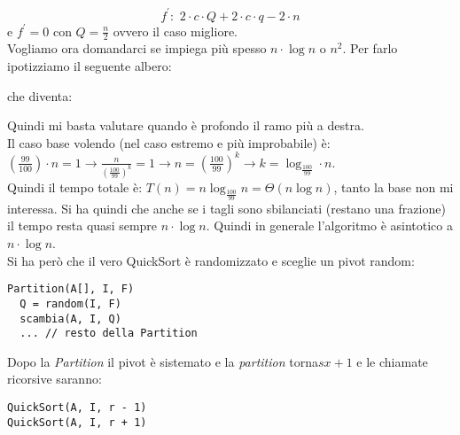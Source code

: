 \documentclass[a4paper,12pt,oneside,tikz]{book}
\begin{document}
$$f^{'}:\,\, 2\cdot c\cdot Q+2\cdot c\cdot q-2\cdot n$$
e $f^{'}=0$ con $Q=\frac{n}{2}$ ovvero il caso migliore.\\
Vogliamo ora domandarci se impiega più spesso $n\cdot\log n$ o $n^2$. Per farlo ipotizziamo il seguente albero:
\begin{center}
\end{center}
che diventa: 
\begin{center}
\end{center}
\newpage
Quindi mi basta valutare quando è profondo il ramo più a destra.\\
Il caso base volendo (nel caso estremo e più improbabile) è: $\left(\frac{99}{100}\right)\cdot n=1\rightarrow\frac{n}{\left(\frac{100}{99}\right)^k}=1\rightarrow n=\left(\frac{100}{99}\right)^k\rightarrow k=\log_{\frac{100}{99}}\cdot n$. \\Quindi il tempo totale è: $T(n)=n\log_{\frac{100}{99}}n=\Theta(n\log n)$, tanto la base non mi interessa.
Si ha quindi che anche se i tagli sono sbilanciati (restano una frazione) il tempo resta quasi sempre $n\cdot\log n$. Quindi in generale l'algoritmo è asintotico a $n\cdot\log n$. \\
Si ha però che il vero QuickSort è randomizzato e sceglie un pivot random:
\begin{verbatim}
Partition(A[], I, F)
  Q = random(I, F)
  scambia(A, I, Q)
  ... // resto della Partition
\end{verbatim}
Dopo la \textit{Partition} il pivot è sistemato e la \textit{partition} torna$sx+1$ e le chiamate ricorsive saranno:
\begin{verbatim}
QuickSort(A, I, r - 1)
QuickSort(A, I, r + 1)
\end{verbatim} 
\end{document}
